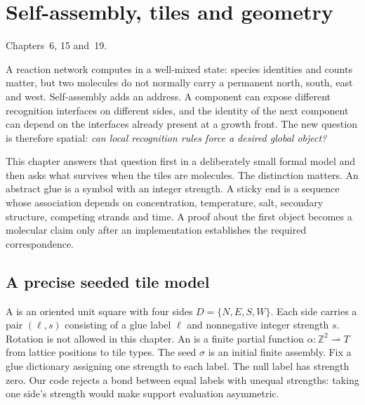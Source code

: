 \chapter{Self-assembly, tiles and geometry}
{Chapters~6, 15 and~19.}

A reaction network computes in a well-mixed state: species identities and counts
matter, but two molecules do not normally carry a permanent north, south, east and
west. Self-assembly adds an address. A component can expose different recognition
interfaces on different sides, and the identity of the next component can depend on
the interfaces already present at a growth front. The new question is therefore
spatial: \emph{can local recognition rules force a desired global object?}

This chapter answers that question first in a deliberately small formal model and
then asks what survives when the tiles are molecules. The distinction matters.
An abstract glue is a symbol with an integer strength. A sticky end is a sequence
whose association depends on concentration, temperature, salt, secondary structure,
competing strands and time. A proof about the first object becomes a molecular
claim only after an implementation establishes the required correspondence.

\section{A precise seeded tile model}

A  is an oriented unit square with four sides
$D=\{N,E,S,W\}$. Each side carries a pair $(\ell,s)$ consisting of a glue label
$\ell$ and nonnegative integer strength $s$. Rotation is not allowed in this
chapter. An  is a finite partial function
$\alpha:\mathbb Z^2\rightharpoonup T$ from lattice positions to tile types.
The seed $\sigma$ is an initial finite assembly.
Fix a glue dictionary assigning one strength to each label. The null label has
strength zero. Our code rejects a bond between equal labels with unequal
strengths: taking one side's strength would make support evaluation asymmetric.

